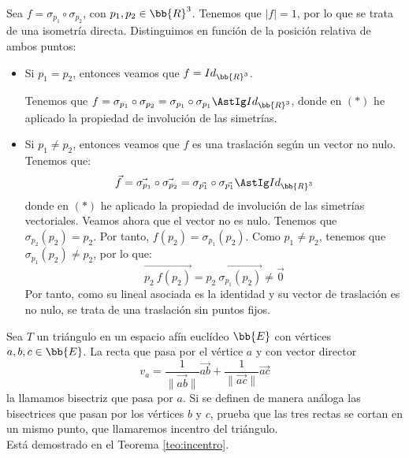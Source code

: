 \begin{ejercicio}
\begin{enumerate}
        Sea $f = \sigma_{p_1} \circ \sigma_{p_2}$, con $p_1, p_2 \in \bb{R}^3$. Tenemos que $|f| = 1$, por lo que se trata de una isometría directa. Distinguimos en función de la posición relativa de ambos puntos:
        \begin{itemize}
            \item Si $p_1=p_2$, entonces veamos que $f=Id_{\bb{R}^3}$.
            
            Tenemos que $f=\sigma_{p_1} \circ \sigma_{p_2}=\sigma_{p_1} \circ \sigma_{p_1} \AstIg Id_{\bb{R}^3}$,
            donde en $(\ast)$ he aplicado la propiedad de involución de las simetrías.

            \item Si $p_1 \neq p_2$, entonces veamos que $f$ es una traslación según un vector no nulo. Tenemos que:
            \begin{equation*}
                \vec{f} = \vec{\sigma_{p_1}} \circ \vec{\sigma_{p_2}} = \sigma_{\vec{p_1}} \circ \sigma_{\vec{p_1}} \AstIg Id_{\bb{R}^3}
            \end{equation*}
            donde en $(\ast)$ he aplicado la propiedad de involución de las simetrías vectoriales. Veamos ahora que el vector no es nulo.
            Tenemos que $\sigma_{p_2}(p_2)=p_2$. Por tanto, $f(p_2)=\sigma_{p_1}(p_2)$. Como $p_1 \neq p_2$, tenemos que $\sigma_{p_1}(p_2) \neq p_2$, por lo que:
            \begin{equation*}
                \vec{p_2~f(p_2)} = \vec{p_2~\sigma_{p_1}(p_2)} \neq \vec{0}
            \end{equation*}
            Por tanto, como su lineal asociada es la identidad y su vector de traslación es no nulo, se trata de una traslación sin puntos fijos.
        \end{itemize}
    \end{enumerate}
\end{ejercicio}

\begin{ejercicio} 
    Sea $T$ un triángulo en un espacio afín euclídeo $\bb{E}$ con vértices $a, b, c \in \bb{E}$. La recta que pasa por el vértice $a$ y con vector director
    \begin{equation*}
        v_a=\frac{1}{\|\vec{ab}\|} \vec{ab} + \frac{1}{\|\vec{ac}\|}\vec{ac}
    \end{equation*}
    la llamamos bisectriz que pasa por $a$. Si se definen de manera análoga las bisectrices que pasan por los vértices $b$ y $c$,
    prueba que las tres rectas se cortan en un mismo punto, que llamaremos incentro del triángulo.\\

    Está demostrado en el Teorema \ref{teo:incentro}.
\end{ejercicio}

